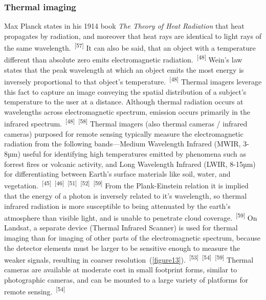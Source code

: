 \documentclass{article}
\begin{document}
\subsubsection{Thermal imaging}


\par{Max Planck states in his 1914 book \textit{The Theory of Heat Radiation} that heat propagates by radiation, and moreover that heat rays are identical to light rays of the same wavelength.~\textsuperscript{[57]} It can also be said, that an object with a temperature different than absolute zero emits electromagnetic radiation.~\textsuperscript{[48]} Wein's law states that the peak wavelength at which an object emits the most energy is inversely proportional to that object's temperature.~\textsuperscript{[48]} Thermal imagers leverage this fact to capture an image conveying the spatial distribution of a subject's temperature to the user at a distance. Although thermal radiation occurs at wavelengths across electromagnetic spectrum, emission occurs primarily in the infrared spectrum.~\textsuperscript{[48]}~\textsuperscript{[58]} Thermal imagers (also thermal cameras / infrared cameras) purposed for remote sensing typically measure the electromagnetic radiation from the following bands---Medium Wavelength Infrared (MWIR, 3-8µm) useful for identifying high temperatures emitted by phenomena such as forrest fires or volcanic activity, and Long Wavelength Infrared (LWIR, 8-15µm) for differentiating between Earth's surface materials like soil, water, and vegetation.~\textsuperscript{[45]}~\textsuperscript{[46]}~\textsuperscript{[51]}~\textsuperscript{[52]}~\textsuperscript{[59]} From the Plank-Einstein relation it is implied that the energy of a photon is inversely related to it's wavelength, so thermal infrared radiation is more susceptible to being attenuated by the earth's atmosphere than visible light, and is unable to penetrate cloud coverage.~\textsuperscript{[59]} On Landsat, a separate device (Thermal Infrared Scanner) is used for thermal imaging than for imaging of other parts of the electromagnetic spectrum, because the detector elements must be larger to be sensitive enough to measure the weaker signals, resulting in coarser resolution~(\cref{figure13}).~\textsuperscript{[53]}~\textsuperscript{[54]}~\textsuperscript{[59]} Thermal cameras are available at moderate cost in small footprint forms, similar to photographic cameras, and can be mounted to a large variety of platforms for remote sensing.~\textsuperscript{[54]}}
\end{document}

